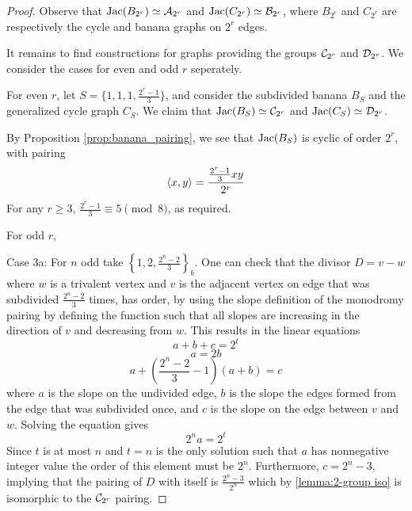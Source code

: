 \documentclass{amsart}
\begin{document}
\begin{proof}
  Observe that $\operatorname{Jac}(B_{2^r}) \simeq \mathcal{A}_{2^{r}}$ and $\operatorname{Jac}(C_{2^r}) \simeq
  \mathcal{B}_{2^{r}}$, where $B_{2^r}$ and $C_{2^r}$ are respectively the cycle and
  banana graphs on $2^r$ edges.

  It remains to find constructions for graphs providing the groups
  $\mathcal{C}_{2^{r}}$ and $\mathcal{D}_{2^{r}}$. We consider the cases for even and odd $r$
  seperately.


  For even $r$, let $S = \{1, 1, 1, \frac{2^r - 1}{3}\}$, and consider
  the subdivided banana $B_S$ and the generalized cycle graph
  $C_S$. We claim that $\operatorname{Jac}(B_S) \simeq \mathcal{C}_{2^{r}}$ and $\operatorname{Jac}(C_S) \simeq
  \mathcal{D}_{2^{r}}$. 

  By Proposition \ref{prop:banana_pairing}, we see that $\operatorname{Jac}(B_S)$ is
  cyclic of order $2^r$, with pairing
  \begin{equation*}
    \langle x, y \rangle = \dfrac{\frac{2^r-1}{3}xy}{2^r}
  \end{equation*}
  For any $r \ge 3$, $\frac{2^r - 1}{3} \equiv 5 \pmod 8$, as required.

  For odd $r$, 

  Case 3a: For $n$ odd take $\left\{1,
    2,\frac{2^{n}-2}{3}\right\}_{b}$. One can check that the divisor
  $D=v-w$ where $w$ is a trivalent vertex and $v$ is the adjacent
  vertex on edge that was subdivided $\frac{2^{n}-2}{3}$ times, has
  order, by using the slope definition of the monodromy pairing by
  defining the function such that all slopes are increasing in the
  direction of $v$ and decreasing from $w$. This results in the linear
  equations
  \begin{equation*}
a+b+c=2^{t}
  \end{equation*}
  \begin{equation*}
a=2b
  \end{equation*}
  \begin{equation*}
a+\left(\frac{2^{n}-2}{3}-1\right)(a+b)=c
  \end{equation*}
where $a$ is the slope on the undivided edge, $b$ is the
slope the edges formed from the edge that was subdivided once, and $c$ is the slope
on the edge between $v$ and $w$. Solving the equation gives
\begin{equation*}
2^{n}a=2^{t}
\end{equation*}
Since $t$ is at most $n$ and $t=n$ is the only solution such that $a$
has nonnegative integer value the order of this element must be
$2^{n}$. Furthermore, $c=2^{n}-3$, implying that the pairing of $D$
with itself is $\frac{2^{n}-3}{2^{n}}$ which by \ref{lemma:2-group
  iso} is isomorphic to the $\mathcal{C}_{2^{r}}$ pairing.


\end{proof}
\end{document}
